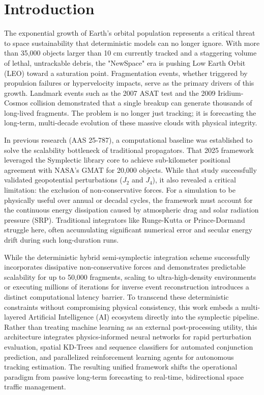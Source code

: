 \documentclass[letterpaper,11pt]{AAS}
\begin{document}
\section{Introduction}

The exponential growth of Earth’s orbital population represents a critical threat to space sustainability that deterministic models can no longer ignore. With more than 35,000 objects larger than 10 cm currently tracked and a staggering volume of lethal, untrackable debris, the "NewSpace" era is pushing Low Earth Orbit (LEO) toward a saturation point\cite{european_space_agency_space_nodate}\cite{diserens_newspace_2020}. Fragmentation events, whether triggered by propulsion failures or hypervelocity impacts, serve as the primary drivers of this growth\cite{kessler_collision_1978}. Landmark events such as the 2007 ASAT test and the 2009 Iridium-Cosmos collision demonstrated that a single breakup can generate thousands of long-lived fragments\cite{wang_analysis_2010}. The problem is no longer just tracking; it is forecasting the long-term, multi-decade evolution of these massive clouds with physical integrity.

In previous research (AAS 25-787), a computational baseline was established to solve the scalability bottleneck of traditional propagators. That 2025 framework leveraged the Symplectic library core to achieve sub-kilometer positional agreement with NASA’s GMAT for 20,000 objects\cite{noauthor_general_nodate}. While that study successfully validated geopotential perturbations ($J_2$ and $J_4$), it also revealed a critical limitation: the exclusion of non-conservative forces. For a simulation to be physically useful over annual or decadal cycles, the framework must account for the continuous energy dissipation caused by atmospheric drag and solar radiation pressure (SRP). Traditional integrators like Runge-Kutta or Prince-Dormand struggle here, often accumulating significant numerical error and secular energy drift during such long-duration runs.

While the deterministic hybrid semi-symplectic integration scheme successfully incorporates dissipative non-conservative forces and demonstrates predictable scalability for up to 50,000 fragments, scaling to ultra-high-density environments or executing millions of iterations for inverse event reconstruction introduces a distinct computational latency barrier. To transcend these deterministic constraints without compromising physical consistency, this work embeds a multi-layered Artificial Intelligence (AI) ecosystem directly into the symplectic pipeline. Rather than treating machine learning as an external post-processing utility, this architecture integrates physics-informed neural networks for rapid perturbation evaluation, spatial KD-Trees and sequence classifiers for automated conjunction prediction, and parallelized reinforcement learning agents for autonomous tracking estimation. The resulting unified framework shifts the operational paradigm from passive long-term forecasting to real-time, bidirectional space traffic management.
\end{document}
